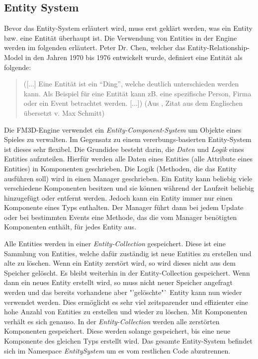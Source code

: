 \subsection{Entity System}
\label{entitysystem}
Bevor das Entity-System erläutert wird, muss erst geklärt werden, was ein Entity bzw. eine Entität überhaupt ist. Die Verwendung von Entities in der Engine werden im folgenden erläutert.
Peter Dr. Chen, welcher das Entity-Relationship-Model in den Jahren 1970 bis 1976 entwickelt wurde, definiert eine Entität als folgende:
\begin{quote}
	([...] Eine Entität ist ein "`Ding"', welche deutlich unterschieden werden kann. Als Beispiel für eine Entität kann zB. eine spezifische Person, Firma oder ein Event betrachtet werden. [...])
	(Aus \cite{entityrelationshipmodel}, Zitat aus dem Englischen übersetzt v. Max Schmitt)
\end{quote}
Die FM3D-Engine verwendet ein \textit{Entity-Component-System} um Objekte eines Spieles zu verwalten. Im Gegensatz zu einem vererbungs-basierten Entity-System ist dieses sehr flexibel. 
Die Grundidee besteht darin, die \textit{Daten} und \textit{Logik} eines Entities aufzuteilen. Hierfür werden alle Daten eines Entities (alle Attribute eines Entities) in Komponenten geschrieben. %
Die Logik (Methoden, die das Entity ausführen soll) wird in einen Manager geschrieben. 
Ein Entity kann beliebig viele verschiedene Komponenten besitzen und sie können während der Laufzeit beliebig hinzugefügt oder entfernt werden. Jedoch kann ein Entity immer nur einen Komponente eines Typs enthalten. 
Der Manager führt dann bei jedem Update oder bei bestimmten Events eine Methode, das die vom Manager benötigten Komponenten enthält, für jedes Entity aus.

Alle Entities werden in einer \textit{Entity-Collection} gespeichert. Diese ist eine Sammlung von Entities, welche dafür zuständig ist neue Entities zu erstellen und alte zu löschen. Wenn ein Entity zerstört wird, so wird dieses nicht aus dem Speicher gelöscht. Es bleibt weiterhin in der Entity-Collection gespeichert. 
Wenn dann ein neues Entity erstellt wird, so muss nicht neuer Speicher angefragt werden und das bereits vorhandene aber "'gelöschte"` Entity kann nun wieder verwendet werden. Dies ermöglicht es sehr viel zeitsparender und effizienter eine hohe Anzahl von Entities zu erstellen und wieder zu löschen. 
Mit Komponenten verhält es sich genauso. In der \textit{Entity-Collection} werden alle zerstörten Komponenten gespeichert. Diese werden solange gespeichert, bis eine neue Komponente des gleichen Typs erstellt wird. Das gesamte Entity-System befindet sich im Namespace \textit{EntitySystem} um es vom restlichen Code abzutrennen.

